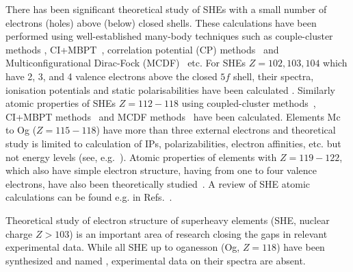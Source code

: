 \documentclass[10pt,a4paper, twoside, openright]{report}
\begin{document}
There has been significant theoretical study of SHEs with a small number of electrons (holes) above (below) closed shells. 
These calculations have been performed using well-established many-body techniques such  as couple-cluster methods \cite{Lindgren1986,Blundell1991}, CI+MBPT~\cite{Dzuba1996}, correlation potential (CP) methods~\cite{Dzuba1989} and Multiconfigurational Dirac-Fock (MCDF)~\cite{Grant1988} etc.  For SHEs $Z=102,103,104$ which have 2, 3, and 4 valence electrons above the  closed $5f$ shell, their spectra, ionisation potentials and static polarisabilities have been calculated \cite{Liu2007,Desclaux1980,Eliav1995,Fritzsche2007,Zou2002,Borschevsky2007,Martin1996,Mosyagin2010, DSS2014, Eliav2015, Kaldor2007}. Similarly atomic properties of SHEs  $Z=112-118$ using  coupled-cluster methods~\cite{DF2016, Pershina2008, Nash2005,Landau2001,Borschevsky2015, Thierfelder2008,Kaldor2008,Dinh2016,Indelicato2007}, CI+MBPT methods~\cite{Dinh2008, Dzuba1996} and MCDF methods~\cite{Eliav1996, Yu2008} have been calculated. 
Elements Mc to Og ($Z=115-118$) have more than three external electrons and theoretical study is limited to
calculation of IPs, polarizabilities, electron affinities, etc. but not energy levels (see, e.g.~\cite{Borschevsky2015}).
Atomic properties of elements with $Z=119-122$, which also have simple electron structure, having from one to four valence
electrons,  have also been theoretically studied~\cite{Landau2001a, Lim2005, Dinh120_2008, Dinh2008a, Gaigalas2010, Borschevsky2013, Skripnikov2013, Dzuba2013, Ginges2015, Eliav2015}. A review of SHE atomic calculations can be found  e.g. in 
Refs.~\cite{Eliav2015,Schwerdtfeger2014}.

Theoretical study of electron structure of superheavy elements (SHE, nuclear charge $Z>103$) is an important area of research closing the gaps in relevant experimental data. While all SHE up to oganesson (Og, $Z=118$) have been synthesized and named \cite{Karol2016, HHO2013, OUL2004}, experimental data on their spectra are absent.
\end{document}
